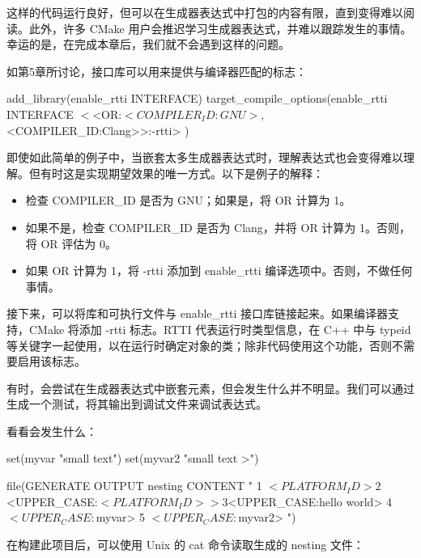 这样的代码运行良好，但可以在生成器表达式中打包的内容有限，直到变得难以阅读。此外，许多 CMake 用户会推迟学习生成器表达式，并难以跟踪发生的事情。幸运的是，在完成本章后，我们就不会遇到这样的问题。


如第5章所讨论，接口库可以用来提供与编译器匹配的标志：

\begin{cmake}
add_library(enable_rtti INTERFACE)
target_compile_options(enable_rtti INTERFACE
    $<$<OR:$<COMPILER_ID:GNU>,$<COMPILER_ID:Clang>>:-rtti>
)
\end{cmake}

即使如此简单的例子中，当嵌套太多生成器表达式时，理解表达式也会变得难以理解。但有时这是实现期望效果的唯一方式。以下是例子的解释：

\begin{itemize}
\item
检查 COMPILER\_ID 是否为 GNU；如果是，将 OR 计算为 1。

\item
如果不是，检查 COMPILER\_ID 是否为 Clang，并将 OR 计算为 1。否则，将 OR 评估为 0。

\item
如果 OR 计算为 1，将 -rtti 添加到 enable\_rtti 编译选项中。否则，不做任何事情。
\end{itemize}

接下来，可以将库和可执行文件与 enable\_rtti 接口库链接起来。如果编译器支持，CMake 将添加 -rtti 标志。RTTI 代表运行时类型信息，在 C++ 中与 typeid 等关键字一起使用，以在运行时确定对象的类；除非代码使用这个功能，否则不需要启用该标志。


有时，会尝试在生成器表达式中嵌套元素，但会发生什么并不明显。我们可以通过生成一个测试，将其输出到调试文件来调试表达式。

看看会发生什么：


\begin{cmake}
set(myvar "small text")
set(myvar2 "small text >")

file(GENERATE OUTPUT nesting CONTENT "
    1 $<PLATFORM_ID>
    2 $<UPPER_CASE:$<PLATFORM_ID>>
    3 $<UPPER_CASE:hello world>
    4 $<UPPER_CASE:${myvar}>
    5 $<UPPER_CASE:${myvar2}>
")
\end{cmake}

在构建此项目后，可以使用 Unix 的 cat 命令读取生成的 nesting 文件：

